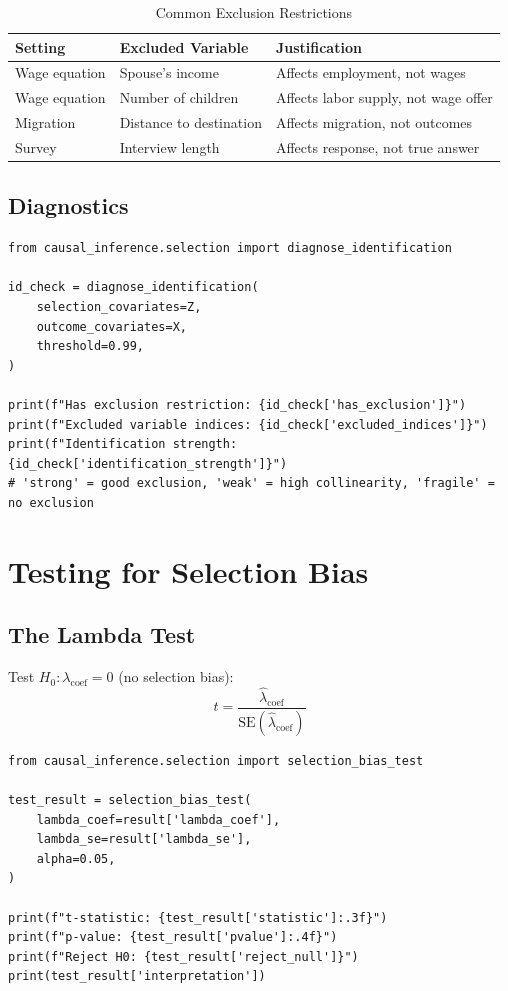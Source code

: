\begin{table}[h]
\centering
\caption{Common Exclusion Restrictions}
\begin{tabular}{lll}
\toprule
Setting & Excluded Variable & Justification \\
\midrule
Wage equation & Spouse's income & Affects employment, not wages \\
Wage equation & Number of children & Affects labor supply, not wage offer \\
Migration & Distance to destination & Affects migration, not outcomes \\
Survey & Interview length & Affects response, not true answer \\
\bottomrule
\end{tabular}
\end{table}

\subsection{Diagnostics}

\begin{verbatim}
from causal_inference.selection import diagnose_identification

id_check = diagnose_identification(
    selection_covariates=Z,
    outcome_covariates=X,
    threshold=0.99,
)

print(f"Has exclusion restriction: {id_check['has_exclusion']}")
print(f"Excluded variable indices: {id_check['excluded_indices']}")
print(f"Identification strength: {id_check['identification_strength']}")
# 'strong' = good exclusion, 'weak' = high collinearity, 'fragile' = no exclusion
\end{verbatim}


\section{Testing for Selection Bias}

\subsection{The Lambda Test}

Test $H_0: \lambda_{\text{coef}} = 0$ (no selection bias):
\begin{equation}
t = \frac{\hat{\lambda}_{\text{coef}}}{\text{SE}(\hat{\lambda}_{\text{coef}})}
\end{equation}

\begin{verbatim}
from causal_inference.selection import selection_bias_test

test_result = selection_bias_test(
    lambda_coef=result['lambda_coef'],
    lambda_se=result['lambda_se'],
    alpha=0.05,
)

print(f"t-statistic: {test_result['statistic']:.3f}")
print(f"p-value: {test_result['pvalue']:.4f}")
print(f"Reject H0: {test_result['reject_null']}")
print(test_result['interpretation'])
\end{verbatim}

